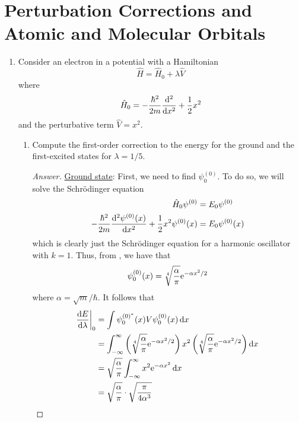 \documentclass[../psets.tex]{subfiles}
\begin{document}
\section{Perturbation Corrections and Atomic and Molecular Orbitals}
\begin{enumerate}
    \item {}Consider an electron in a potential with a Hamiltonian
    \begin{equation*}
        \hat{H} = \hat{H}_0+\lambda\hat{V}
    \end{equation*}
    where
    \begin{equation*}
        \hat{H}_0 = -\frac{\hbar^2}{2m}\dv[2]{x}+\frac{1}{2}x^2
    \end{equation*}
    and the perturbative term $\hat{V}=x^2$.
    \begin{enumerate}
        \item Compute the first-order correction to the energy for the ground and the first-excited states for $\lambda=1/5$.
        \begin{proof}[Answer]
            \underline{Ground state}: First, we need to find $\psi_0^{(0)}$. To do so, we will solve the Schr\"{o}dinger equation
            \begin{align*}
                \hat{H}_0\psi^{(0)} &= E_0\psi^{(0)}\\
                -\frac{\hbar^2}{2m}\dv[2]{\psi^{(0)}(x)}{x}+\frac{1}{2}x^2\psi^{(0)}(x) &= E_0\psi^{(0)}(x)
            \end{align*}
            which is clearly just the Schr\"{o}dinger equation for a harmonic oscillator with $k=1$. Thus, from \textcite{bib:McQuarrieSimon}, we have that
            \begin{equation*}
                \psi_0^{(0)}(x) = \sqrt[4]{\frac{\alpha}{\pi}}\e[-\alpha x^2/2]
            \end{equation*}
            where $\alpha=\sqrt{m}/\hbar$. It follows that
            \begin{align*}
                \dv{E}{\lambda}\bigg|_0 &= \int\psi_0^{(0)^*}(x)V\psi_0^{(0)}(x)\dd{x}\\
                &= \int_{-\infty}^\infty\left( \sqrt[4]{\frac{\alpha}{\pi}}\e[-\alpha x^2/2] \right)x^2\left( \sqrt[4]{\frac{\alpha}{\pi}}\e[-\alpha x^2/2] \right)\dd{x}\\
                &= \sqrt{\frac{\alpha}{\pi}}\int_{-\infty}^\infty x^2\e[-\alpha x^2]\dd{x}\\
                &= \sqrt{\frac{\alpha}{\pi}}\cdot\sqrt{\frac{\pi}{4\alpha^3}}\\

\end{align*}
\end{proof}
\end{enumerate}
\end{enumerate}
\end{document}
